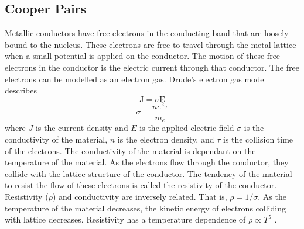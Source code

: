 \documentclass[letterpaper,english,reprint, aps]{revtex4-1}
\begin{document}
\subsection{Cooper Pairs}
Metallic conductors have free electrons in the conducting band that are loosely bound to the nucleus. These electrons are free to travel through the metal lattice when a small potential is applied on the conductor. The motion of these free electrons in the conductor is the electric current through that conductor. The free electrons can be modelled as an electron gas. Drude's electron gas model describes \citep{feynman}
\begin{equation}
    \label{ohms_law}
    \mathrm{J} = \sigma \mathrm{E}
\end{equation}
\begin{equation}
    \label{conductivity}
    \sigma = \frac{ne^2 \tau}{m_e}
\end{equation}
where $J$ is the current density and $E$ is the applied electric field $\sigma$ is the conductivity of the material, $n$ is the electron density, and $\tau$ is the collision time of the electrons. The conductivity of the material is dependant on the temperature of the material. As the electrons flow through the conductor, they collide with the lattice structure of the conductor. The tendency of the material to resist the flow of these electrons is called the resistivity of the conductor. Resistivity ($\rho$) and conductivity are inversely related. That is, $\rho = 1/\sigma$. As the temperature of the material decreases, the kinetic energy of electrons colliding with lattice decreases. Resistivity has a temperature dependence of $\rho \propto T^5$ \citep{cooper_pairs, vanduzer}.
\end{document}
